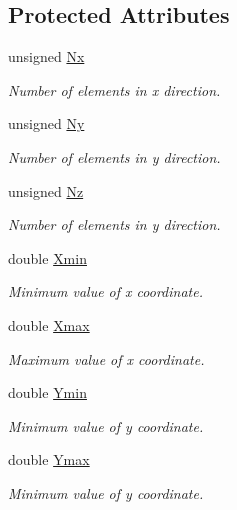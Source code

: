 \subsection*{Protected Attributes}
\begin{DoxyCompactItemize}
\item 
unsigned \hyperlink{classoomph_1_1SimpleCubicMesh_aad51fb31a4f31f2681740793a07594e9}{Nx}
\begin{DoxyCompactList}\small\item\em Number of elements in x direction. \end{DoxyCompactList}\item 
unsigned \hyperlink{classoomph_1_1SimpleCubicMesh_a084445d7cbea1c3d1d67739934bbd6ec}{Ny}
\begin{DoxyCompactList}\small\item\em Number of elements in y direction. \end{DoxyCompactList}\item 
unsigned \hyperlink{classoomph_1_1SimpleCubicMesh_a370e4597208fa51bca60750ae1e5acd4}{Nz}
\begin{DoxyCompactList}\small\item\em Number of elements in y direction. \end{DoxyCompactList}\item 
double \hyperlink{classoomph_1_1SimpleCubicMesh_ad04c180e97b51e795d79759916006d0f}{Xmin}
\begin{DoxyCompactList}\small\item\em Minimum value of x coordinate. \end{DoxyCompactList}\item 
double \hyperlink{classoomph_1_1SimpleCubicMesh_afdfcb28e93c910a57b9c6ab116f5fd2f}{Xmax}
\begin{DoxyCompactList}\small\item\em Maximum value of x coordinate. \end{DoxyCompactList}\item 
double \hyperlink{classoomph_1_1SimpleCubicMesh_a7a004fc52edde081924073c49b0dd853}{Ymin}
\begin{DoxyCompactList}\small\item\em Minimum value of y coordinate. \end{DoxyCompactList}\item 
double \hyperlink{classoomph_1_1SimpleCubicMesh_a7933aa6e3d1755d6a5fbcc2a16af79a7}{Ymax}
\begin{DoxyCompactList}\small\item\em Minimum value of y coordinate. \end{DoxyCompactList}\item 

\end{DoxyCompactItemize}
